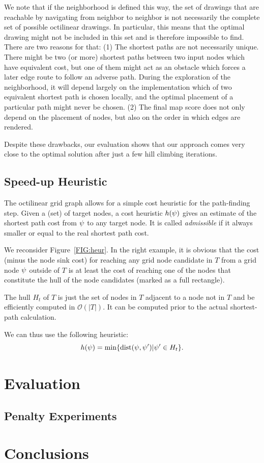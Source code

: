 \documentclass{sig-alternate-sigmod09}
\begin{document}
We note that if the neighborhood is defined this way, the set of drawings that are reachable by navigating from neighbor to neighbor is not necessarily the complete set of possible octilinear drawings.
In particular, this means that the optimal drawing might not be included in this set and is therefore impossible to find.
There are two reasons for that: 
(1) The shortest paths are not necessarily unique.
There might be two (or more) shortest paths between two input nodes which have equivalent cost, but one of them might act as an obstacle which forces a later edge route to follow an adverse path.
During the exploration of the neighborhood, it will depend largely on the implementation which of two equivalent shortest path is chosen locally, and the optimal placement of a particular path might never be chosen.
(2) The final map score does not only depend on the placement of nodes, but also on the order in which edges are rendered.

Despite these drawbacks, our evaluation shows that our approach comes very close to the optimal solution after just a few hill climbing iterations.

\subsection{Speed-up Heuristic}

The octilinear grid graph allows for a simple cost heuristic for the path-finding step.
Given a (set) of target nodes, a cost heuristic $h(\psi)$ gives an estimate of the shortest path cost from $\psi$ to any target node.
It is called \emph{admissible} if it always smaller or equal to the real shortest path cost.

We reconsider Figure~\ref{FIG:heur}.
In the right example, it is obvious that the cost (minus the node sink cost) for reaching any grid node candidate in $T$ from a grid node $\psi$ outside of $T$ is at least the cost of reaching one of the nodes that constitute the hull of the node candidates (marked as a full rectangle).

The hull $H_t$ of $T$ is just the set of nodes in $T$ adjacent to a node not in $T$ and be efficiently computed in $\mathcal{O}(|T|)$.
It can be computed prior to the actual shortest-path calculation.

We can thus use the following heuristic:
%
\begin{equation}
	h(\psi) = \min\{ \text{dist}(\psi, \psi') | \psi' \in H_t \}.
\end{equation}


\section{Evaluation}

\subsection{Penalty Experiments}

\section{Conclusions}


\balancecolumns
\end{document}
